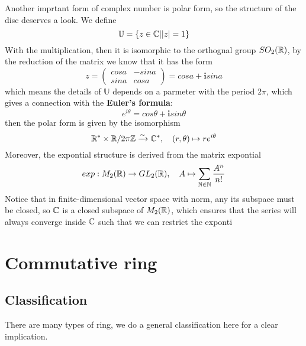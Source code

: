 \documentclass[en,geye,blue,normal,12pt]{elegantnote}
\begin{document}
Another imprtant form of complex number is polar form, so the structure of the disc deserves a look. We define
\[\mathbb{U} = \{z\in \mathbb{C} | |z| = 1 \}\]
With the multiplication, then it is isomorphic to the orthognal group \(SO_2(\mathbb{R})\), by the reduction of the matrix we know that it has the form
\[z = \begin{pmatrix}
  cosa & -sina \\
  sina & cosa 
\end{pmatrix}= cosa + \mathbf{i}sina\]
which means the details of \(\mathbb{U}\) depends on a parmeter with the period \(2 \pi\), which gives a connection with the \textbf{Euler's formula}:
\[e^{i \theta} = cos\theta + \mathbf{i} sin\theta\]
then the polar form is given by the isomorphism
\[\mathbb{R}^* \times \mathbb{R}/ 2\pi \mathbb{Z}  \xrightarrow{\sim} \mathbb{C}^*, \quad (r,\theta) \mapsto re^{i\theta}
\]
Moreover, the expontial structure is derived from the matrix expontial
\[exp: M_2(\mathbb{R}) \to GL_2(\mathbb{R}), \quad A \mapsto \sum_{\mathbb{N} \in \mathbb{N}} \frac{A^n}{n!}\]
Notice that in finite-dimensional vector space with norm, any its subspace must be closed, so \(\mathbb{C}\) is a closed subspace of \(M_2(\mathbb{R})\), which ensures that the series will always converge inside \(\mathbb{C}\) such that we can restrict the exponti


\newpage

\section{Commutative ring}

\subsection{Classification}
There are many types of ring, we do a general classification here for a clear implication.
\end{document}
